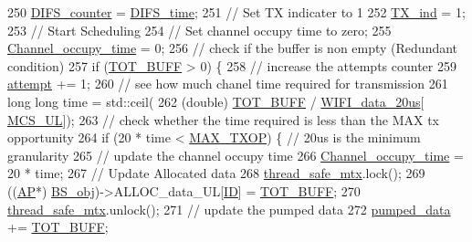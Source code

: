 \begin{DoxyCode}
250                 \hyperlink{classSTA_a94200f37027c90163adc2cee2c502a90}{DIFS\_counter} = \hyperlink{classSTA_a156a07b07e16882d60b93571b8e3cd21}{DIFS\_time};
251                 \textcolor{comment}{// Set TX indicater to 1}
252                 \hyperlink{classSTA_a0ad8be1dec7b752e1be4f13e03faae4c}{TX\_ind} = 1;
253                 \textcolor{comment}{// Start Scheduling}
254                 \textcolor{comment}{// Set channel occupy time to zero;}
255                 \hyperlink{classSTA_a409c7dfb7f0dd3688fdf655a36cdb9bc}{Channel\_occupy\_time} = 0;
256                 \textcolor{comment}{// check if the buffer is non empty (Redundant condition)}
257                 \textcolor{keywordflow}{if} (\hyperlink{classSTA_aea9dd38428aa0d91147434e67ade8dad}{TOT\_BUFF} > 0) \{
258                     \textcolor{comment}{// increase the attempts counter }
259                     \hyperlink{classSTA_a4cfeac60ce7a13a4bbae68b756655dc9}{attempt} += 1;
260                     \textcolor{comment}{// see how much chanel time required for transmission}
261                     \textcolor{keywordtype}{long} \textcolor{keywordtype}{long} time = std::ceil(
262                             (\textcolor{keywordtype}{double}) \hyperlink{classSTA_aea9dd38428aa0d91147434e67ade8dad}{TOT\_BUFF} / \hyperlink{classSTA_a97c786822c28334e2a1d351ae5fe9d52}{WIFI\_data\_20us}[
      \hyperlink{classSTA_a21e0611dde6754144f220cc7312d5909}{MCS\_UL}]);
263                     \textcolor{comment}{// check whether the time required is less than the MAX tx opportunity}
264                     \textcolor{keywordflow}{if} (20 * time < \hyperlink{classSTA_a285a258f933915b75a6de0460ff6f099}{MAX\_TXOP}) \{ \textcolor{comment}{// 20us is the minimum granularity}
265                         \textcolor{comment}{// update the channel occupy time}
266                         \hyperlink{classSTA_a409c7dfb7f0dd3688fdf655a36cdb9bc}{Channel\_occupy\_time} = 20 * time;
267                         \textcolor{comment}{// Update Allocated data}
268                         \hyperlink{STA_8cpp_aaa6351021119738f7a064778438f782c}{thread\_safe\_mtx}.lock();
269                         ((\hyperlink{classAP}{AP}*) \hyperlink{classSTA_abfa329ed1a4539a0f88ef568f41aaac9}{BS\_obj})->ALLOC\_data\_UL[\hyperlink{classSTA_a9376abb50969b5b16aeb5fb0e449e6f7}{ID}] = \hyperlink{classSTA_aea9dd38428aa0d91147434e67ade8dad}{TOT\_BUFF};
270                         \hyperlink{STA_8cpp_aaa6351021119738f7a064778438f782c}{thread\_safe\_mtx}.unlock();
271                         \textcolor{comment}{// update the pumped data}
272                         \hyperlink{classSTA_ae42a5d6c3c4f06388c9dae400b8d2661}{pumped\_data} += \hyperlink{classSTA_aea9dd38428aa0d91147434e67ade8dad}{TOT\_BUFF};

\end{DoxyCode}
